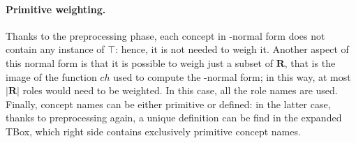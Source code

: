   \paragraph{Primitive weighting.}
  Thanks to the preprocessing phase, each concept in \elh-normal form does not contain any instance of \(\top\): hence, it is not needed to weigh it.
  Another aspect of this normal form is that it is possible to weigh just a subset of \(\mathbf{R}\), that is the image of the function \(ch\) used to compute the \elh-normal form; in this way, at most \(\lvert \mathbf{R} \rvert\) roles would need to be weighted.
  In this case, all the role names are used.
  Finally, concept names can be either primitive or defined:
  in the latter case, thanks to preprocessing again, a unique definition can be find in the expanded TBox, which right side contains exclusively primitive concept names.

